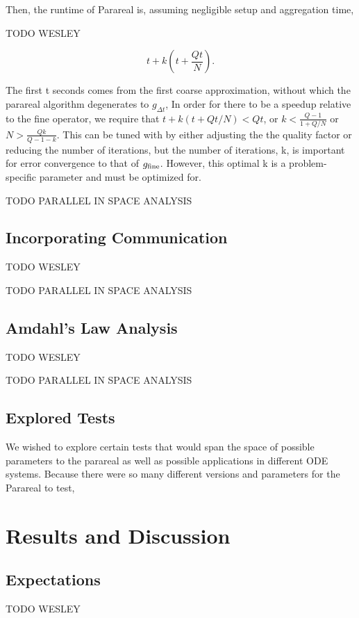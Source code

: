 \documentclass[letterpaper,12pt]{article}
\begin{document}
Then, the runtime of Parareal is, assuming negligible setup and
aggregation time,

TODO WESLEY

\begin{equation}
t + k \left(t + \frac{Qt}{N} \right).
\end{equation}

The first t seconds comes from the first coarse approximation, without which the parareal algorithm degenerates to $g_{\Delta t}$,  In order for there to be a speedup relative to the fine operator, we require
that $t + k(t + Qt/N) < Qt$, or $k < \frac{Q - 1}{1 + Q/N}$ or $N > \frac{Qk}{Q
- 1 - k}$. This can be tuned with by either adjusting the the quality factor or reducing the number of iterations, but the number of iterations, k, is important for error convergence to that of $g_{\textnormal{fine}}$.  However, this optimal k is a problem-specific parameter and must be optimized for.

TODO PARALLEL IN SPACE ANALYSIS

\subsection{Incorporating Communication}

TODO WESLEY

TODO PARALLEL IN SPACE ANALYSIS

\subsection{Amdahl's Law Analysis}

TODO WESLEY

TODO PARALLEL IN SPACE ANALYSIS

\subsection{Explored Tests}

We wished to explore certain tests that would span the space of possible
parameters to the parareal as well as possible applications in different ODE
systems. Because there were so many different versions and parameters for the Parareal to test,

\section{Results and Discussion}

\subsection{Expectations}
TODO WESLEY
\end{document}
